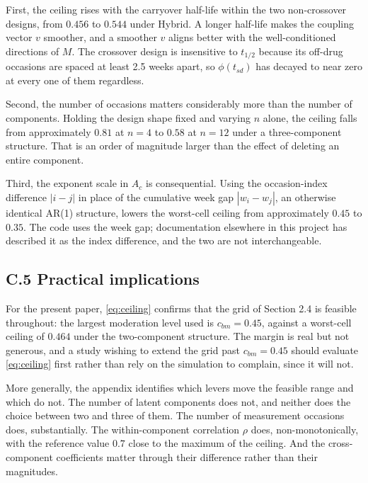 \documentclass[
  11pt,
]{article}
\begin{document}
First, the ceiling rises with the carryover half-life within the two
non-crossover designs, from \(0.456\) to \(0.544\) under Hybrid. A longer
half-life makes the coupling vector \(v\) smoother, and a smoother \(v\)
aligns better with the well-conditioned directions of \(M\). The
crossover design is insensitive to \(t_{1/2}\) because its off-drug
occasions are spaced at least 2.5 weeks apart, so \(\phi(t_{sd})\) has
decayed to near zero at every one of them regardless.

Second, the number of occasions matters considerably more than the
number of components. Holding the design shape fixed and varying \(n\)
alone, the ceiling falls from approximately \(0.81\) at \(n = 4\) to
\(0.58\) at \(n = 12\) under a three-component structure. That is an
order of magnitude larger than the effect of deleting an entire
component.

Third, the exponent scale in \(A_c\) is consequential. Using the
occasion-index difference \(|i-j|\) in place of the cumulative week gap
\(|w_i - w_j|\), an otherwise identical AR(1) structure, lowers the
worst-cell ceiling from approximately \(0.45\) to \(0.35\). The code uses
the week gap; documentation elsewhere in this project has described
it as the index difference, and the two are not interchangeable.

\subsection{C.5 Practical implications}

For the present paper, \eqref{eq:ceiling} confirms that the grid of
Section 2.4 is feasible throughout: the largest moderation level used
is \(c_{bm} = 0.45\), against a worst-cell ceiling of \(0.464\) under the
two-component structure. The margin is real but not generous, and a
study wishing to extend the grid past \(c_{bm} = 0.45\) should evaluate
\eqref{eq:ceiling} first rather than rely on the simulation to
complain, since it will not.

More generally, the appendix identifies which levers move the
feasible range and which do not. The number of latent components does
not, and neither does the choice between two and three of them. The
number of measurement occasions does, substantially. The
within-component correlation \(\rho\) does, non-monotonically, with the
reference value \(0.7\) close to the maximum of the ceiling. And the
cross-component coefficients matter through their difference rather
than their magnitudes.
\end{document}
